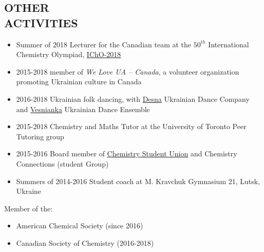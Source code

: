 \documentclass[9pt, margin]{res}
\begin{document}
\begin{resume}
\section{OTHER \\ ACTIVITIES} 

\begin{itemize}
	\item Summer of 2018 Lecturer for the Canadian team at the $50^{th}$ International Chemistry Olympiad, \href{https://50icho.eu}{IChO-2018} 
	\item 2015-2018 member of \textit{We Love UA -- Canada}, a volunteer organization promoting Ukrainian culture in Canada
	\item 2016-2018 Ukrainian folk dancing, with \href{http://www.desna.ca}{Desna} Ukrainian Dance Company and \href{http://www.infoukes.com/vesnianka/}{Vesnianka} Ukrainian Dance Ensemble
	\item 2015-2018 Chemistry and Maths Tutor at the University of Toronto Peer Tutoring group 
	\item 2015-2016 Board member of \href{http://csu.sa.utoronto.ca/exceutive-team-2015-2016/}{Chemistry Student Union} and Chemistry Connections (student Group)
	\item Summers of 2014-2016 Student coach at M. Kravchuk Gymnasium 21, Lutsk, Ukraine
\end{itemize}
Member of the:
\begin{itemize}
	\item American Chemical Society (since 2016)
	\item Canadian Society of Chemistry (2016-2018)
\end{itemize}

\end{resume}
\end{document}
